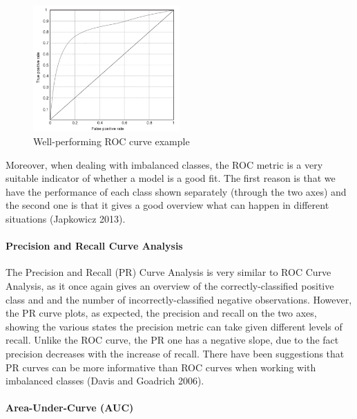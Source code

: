 \documentclass[12pt,]{article}
\let\oldparagraph\paragraph
\renewcommand{\paragraph}[1]{\oldparagraph{#1}\mbox{}}
\begin{document}
\begin{figure}
\centering
\includegraphics[width=0.5\textwidth,height=\textheight]{figures/roc_curve_example.png}
\caption{Well-performing ROC curve example}
\end{figure}

Moreover, when dealing with imbalanced classes, the ROC metric is a very
suitable indicator of whether a model is a good fit. The first reason is
that we have the performance of each class shown separately (through the
two axes) and the second one is that it gives a good overview what can
happen in different situations (Japkowicz 2013).

\hypertarget{precision-and-recall-curve-analysis}{%
\paragraph{Precision and Recall Curve
Analysis}\label{precision-and-recall-curve-analysis}}

The Precision and Recall (PR) Curve Analysis is very similar to ROC
Curve Analysis, as it once again gives an overview of the
correctly-classified positive class and and the number of
incorrectly-classified negative observations. However, the PR curve
plots, as expected, the precision and recall on the two axes, showing
the various states the precision metric can take given different levels
of recall. Unlike the ROC curve, the PR one has a negative slope, due to
the fact precision decreases with the increase of recall. There have
been suggestions that PR curves can be more informative than ROC curves
when working with imbalanced classes (Davis and Goadrich 2006).

\hypertarget{area-under-curve-auc}{%
\paragraph{Area-Under-Curve (AUC)}\label{area-under-curve-auc}}
\end{document}
